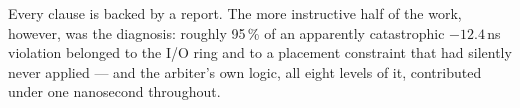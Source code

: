 \documentclass[11pt,a4paper]{article}
\begin{document}
\medskip\noindent
Every clause is backed by a report. The more instructive half of the work,
however, was the diagnosis: roughly 95\,\% of an apparently catastrophic
$-12.4$\,ns violation belonged to the I/O ring and to a placement constraint
that had silently never applied --- and the arbiter's own logic, all eight
levels of it, contributed under one nanosecond throughout.
\end{document}
